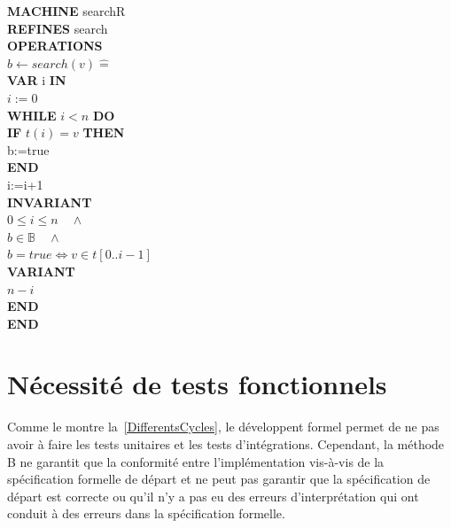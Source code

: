 \documentclass[10pt,a4paper]{article}
\newcommand{\Bequal}{\mathrel{\widehat{=}}}
\begin{document}
\noindent \textbf{MACHINE} searchR \\
\textbf{REFINES} search \\
\textbf{OPERATIONS} \\
$b \leftarrow search(v) \Bequal$ \\
\hspace*{1em} \textbf{VAR} i \textbf{IN} \\
\hspace*{1em} $i:=0$ \\
\hspace*{1em} \textbf{WHILE} $i < n$ \textbf{DO} \\
\hspace*{2em} \textbf{IF} $t(i)=v$ \textbf{THEN} \\
\hspace*{3em} b:=true \\
\hspace*{2em} \textbf{END} \\
\hspace*{2em} i:=i+1 \\
\hspace*{2em} \textbf{INVARIANT} \\
\hspace*{3em} $0 \leq i \leq n \quad \wedge$ \\
\hspace*{3em} $b \in \mathbb{B} \quad \wedge$ \\
\hspace*{3em} $b = true \Leftrightarrow v \in t[0..i-1]$ \\
\hspace*{2em} \textbf{VARIANT} \\
\hspace*{3em} $n-i$ \\
\hspace*{1em}\textbf{END} \\
\textbf{END} \\
\fi

\section{Nécessité de tests fonctionnels}

Comme le montre la~\cref{DifferentsCycles}, le développent formel permet de ne pas avoir à faire les tests unitaires et les tests d'intégrations. Cependant, la méthode B ne garantit que la conformité entre l'implémentation vis-à-vis de la spécification formelle de départ et ne peut pas garantir que la spécification de départ est correcte ou qu'il n'y a pas eu des erreurs d'interprétation qui ont conduit à des erreurs dans la spécification formelle.
\end{document}

